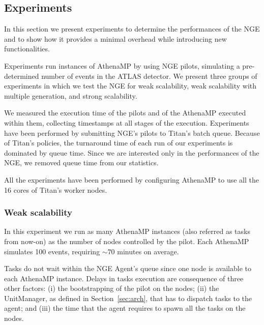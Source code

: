 
\subsection{Experiments}

In this section we present experiments %
to determine the performances of the NGE and to show how it provides a minimal
overhead while introducing new functionalities.

Experiments %
run instances of AthenaMP by using NGE pilots, %
simulating a pre-determined number of events in the ATLAS detector.
We present three groups of experiments in which we test the NGE for weak
scalability, weak scalability with multiple generation, and strong scalability.

We %
measured the execution time of the pilots and of the AthenaMP %
executed within them, collecting timestamps at %
all stages of the execution. Experiments have been performed %
by %
submitting NGE's pilots %
to Titan's batch queue. Because of Titan's %
policies, the turnaround time of each run of our experiments is dominated by
queue time. Since we are interested only in the performances of the NGE, we
removed queue time from our statistics.

All the experiments have been performed by %
configuring AthenaMP
to use all the 16 cores %
of Titan's worker nodes.


\subsubsection{Weak scalability}

In this experiment %
we run as many AthenaMP instances (also referred as tasks from now-on) as the number of nodes controlled by the pilot. Each AthenaMP
simulates 100 events, requiring $\sim 70$ minutes on average.

Tasks do not %
wait within the NGE Agent's queue %
since %
one node %
is available to each AthenaMP instance. %
Delays in tasks execution are consequence of %
three other factors: (i) the bootstrapping of the pilot on the nodes; (ii) the
UnitManager, as defined in Section~\ref{sec:arch}, that has to dispatch tasks to
the agent; and (iii) the time that the agent requires to spawn all the tasks on
the nodes.

